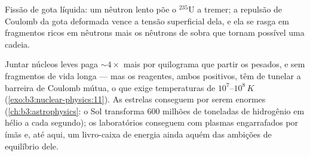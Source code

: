 \begin{omfigure}

{\small Fissão de gota líquida: um nêutron lento põe o $^{235}$U
a tremer; a repulsão de Coulomb da gota deformada vence a tensão
superficial dela, e ela se rasga em fragmentos ricos em nêutrons mais os
nêutrons de sobra que tornam possível uma cadeia.}
\end{omfigure}

\begin{remark}\label{rem:b3:nuclear-physics:fusion}
Juntar núcleos leves paga $\sim4\times$ mais por quilograma que
partir os pesados, e sem fragmentos de vida longa --- mas os
reagentes, ambos positivos, têm de tunelar a barreira de Coulomb
mútua, o que exige temperaturas de $10^7$--$10^8\,\unit{K}$
(\cref{exo:b3:nuclear-physics:11}). As estrelas conseguem por serem
enormes (\cref{ch:b3:astrophysics}: o Sol transforma \qty{600}{} milhões
de toneladas de hidrogênio em hélio a cada segundo); os laboratórios
conseguem com plasmas engarrafados por ímãs e, até aqui, um livro-caixa
de energia ainda aquém das ambições de equilíbrio dele.
\end{remark}

